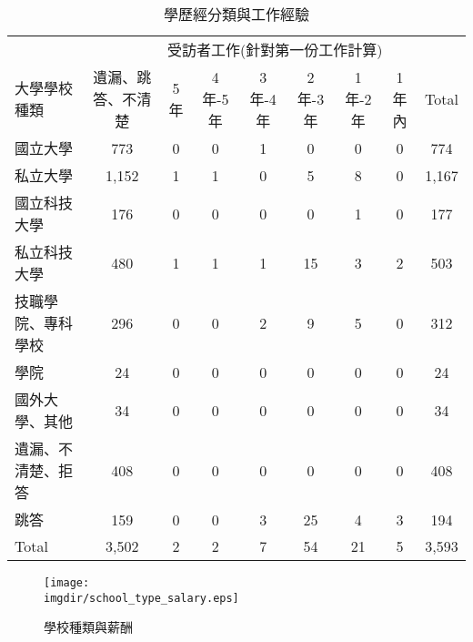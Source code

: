 \documentclass[12pt, a4paper]{article}
\begin{document}
\begin{table}[ht]
\centering
\renewcommand{\arraystretch}{1.3} %
\extrarowheight=4pt
\caption{學歷經分類與工作經驗}
\begin{adjustbox}{width=\textwidth}
\begin{tabular}{l*{8}{c}}
\toprule
& \multicolumn{8}{c}{受訪者工作(針對第一份工作計算)} \\
\cmidrule(lr){2-9}
\multirow{2}{*}{大學學校種類} & \multirow{2}{*}{遺漏、跳答、不清楚} & \multirow{2}{*}{5年} & \multirow{2}{*}{4年-5年} & \multirow{2}{*}{3年-4年} & \multirow{2}{*}{2年-3年} & \multirow{2}{*}{1年-2年} & \multirow{2}{*}{1年內} & \multirow{2}{*}{Total} \\
& &  &  &  &  &  &  &  \\
\midrule
國立大學 & 773 & 0 & 0 & 1 & 0 & 0 & 0 & 774 \\
私立大學 & 1,152 & 1 & 1 & 0 & 5 & 8 & 0 & 1,167 \\
國立科技大學 & 176 & 0 & 0 & 0 & 0 & 1 & 0 & 177 \\
私立科技大學 & 480 & 1 & 1 & 1 & 15 & 3 & 2 & 503 \\
技職學院、專科學校 & 296 & 0 & 0 & 2 & 9 & 5 & 0 & 312 \\
學院 & 24 & 0 & 0 & 0 & 0 & 0 & 0 & 24 \\
國外大學、其他 & 34 & 0 & 0 & 0 & 0 & 0 & 0 & 34 \\
遺漏、不清楚、拒答 & 408 & 0 & 0 & 0 & 0 & 0 & 0 & 408 \\
跳答 & 159 & 0 & 0 & 3 & 25 & 4 & 3 & 194 \\
Total & 3,502 & 2 & 2 & 7 & 54 & 21 & 5 & 3,593 \\
\bottomrule
\end{tabular}
\end{adjustbox}
\end{table}



\begin{figure}[H]
    \centering    
        \texttt{[image: \\imgdir/school\_type\_salary.eps]}
        \caption{學校種類與薪酬}
        \label{pic:學校種類與薪酬}
\end{figure}
\end{document}

